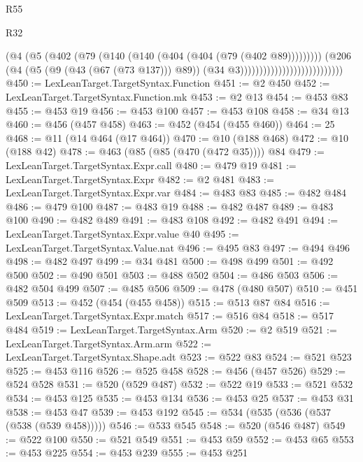 \begin{lexlean}{R55}
\begin{lexlean}{R32}
\begin{coremodule}
{{{{{{{{{{{{{{{{{{{{{{{{{{{{{{{{{{{{{{{{{{{{{{{{{{{                                                  (@4
                                                    (@5
                                                      (@402
                                                        (@79
                                                          (@140
                                                            (@140
                                                              (@404 (@404 (@79 (@402 @89)))))))))
                                                    (@206
                                                      (@4
                                                        (@5 (@9 (@43 (@67 (@73 @137))) @89))
                                                        (@34 @3)))))))))))))))))))))))))))
@450 := LexLeanTarget.TargetSyntax.Function
@451 := @2 @450
@452 := LexLeanTarget.TargetSyntax.Function.mk
@453 := @2 @13
@454 := @453 @83
@455 := @453 @19
@456 := @453 @100
@457 := @453 @108
@458 := @34 @13
@460 := @456 (@457 @458)
@463 := @452 (@454 (@455 @460))
@464 := 25
@468 := @11 (@14 @464 (@17 @464))
@470 := @10 (@188 @468)
@472 := @10 (@188 @42)
@478 := @463 (@85 (@85 (@470 (@472 @35)))) @84
@479 := LexLeanTarget.TargetSyntax.Expr.call
@480 := @479 @19
@481 := LexLeanTarget.TargetSyntax.Expr
@482 := @2 @481
@483 := LexLeanTarget.TargetSyntax.Expr.var
@484 := @483 @83
@485 := @482 @484
@486 := @479 @100
@487 := @483 @19
@488 := @482 @487
@489 := @483 @100
@490 := @482 @489
@491 := @483 @108
@492 := @482 @491
@494 := LexLeanTarget.TargetSyntax.Expr.value @40
@495 := LexLeanTarget.TargetSyntax.Value.nat
@496 := @495 @83
@497 := @494 @496
@498 := @482 @497
@499 := @34 @481
@500 := @498 @499
@501 := @492 @500
@502 := @490 @501
@503 := @488 @502
@504 := @486 @503
@506 := @482 @504 @499
@507 := @485 @506
@509 := @478 (@480 @507)
@510 := @451 @509
@513 := @452 (@454 (@455 @458))
@515 := @513 @87 @84
@516 := LexLeanTarget.TargetSyntax.Expr.match
@517 := @516 @84
@518 := @517 @484
@519 := LexLeanTarget.TargetSyntax.Arm
@520 := @2 @519
@521 := LexLeanTarget.TargetSyntax.Arm.arm
@522 := LexLeanTarget.TargetSyntax.Shape.adt
@523 := @522 @83
@524 := @521 @523
@525 := @453 @116
@526 := @525 @458
@528 := @456 (@457 @526)
@529 := @524 @528
@531 := @520 (@529 @487)
@532 := @522 @19
@533 := @521 @532
@534 := @453 @125
@535 := @453 @134
@536 := @453 @25
@537 := @453 @31
@538 := @453 @47
@539 := @453 @192
@545 := @534 (@535 (@536 (@537 (@538 (@539 @458)))))
@546 := @533 @545
@548 := @520 (@546 @487)
@549 := @522 @100
@550 := @521 @549
@551 := @453 @59
@552 := @453 @65
@553 := @453 @225
@554 := @453 @239
@555 := @453 @251
}}}}}}}}}}}}}}}}}}}}}}}}}}}}}}}}}}}}}}}}}}}}}}}}}}}
\end{coremodule}
\end{lexlean}
\end{lexlean}
